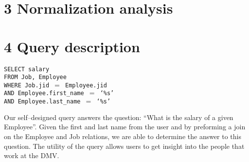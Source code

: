 \documentclass[12pt]{article}
\newcommand\tab[1][1cm]{\hspace*{#1}}
\def\code#1{\texttt{#1}}  %
\begin{document}
\newpage
\section*{3 Normalization analysis}

\newpage
\section*{4 Query description}

\begin{center}
	\begin{minipage}{0.5\linewidth}
	\code{SELECT salary\\
	FROM Job, Employee\\
	WHERE Job.jid $=$ Employee.jid\\
	AND Employee.first\_name $=$ `\%s'\\
	AND Employee.last\_name $=$ `\%s'}
	\end{minipage}
\end{center}

\tab Our self--designed query answers the question: ``What is the salary of a given Employee''. Given the first and last name from the user and by preforming a join on the Employee and Job relations, we are able to determine the answer to this question. The utility of the query allows users to get insight into the people that work at the DMV.
\end{document}
